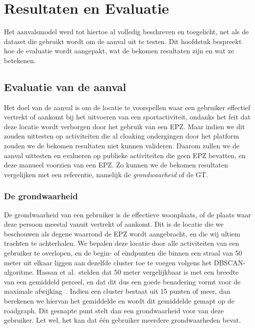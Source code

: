 \chapter{Resultaten en Evaluatie}
Het aanvalsmodel werd tot hiertoe al volledig beschreven en toegelicht, net als
de dataset die gebruikt wordt om de aanval uit te testen. Dit hoofdstuk
bespreekt hoe de evaluatie wordt aangepakt, wat de bekomen resultaten zijn en
wat ze betekenen.

\section{Evaluatie van de aanval}
Het doel van de aanval is om de locatie te voorspellen waar een gebruiker
effectief vertrekt of aankomt bij het uitvoeren van een sportactiviteit,
ondanks het feit dat deze locatie wordt verborgen door het gebruik van een
\ac{EPZ}. Maar indien we dit zouden uittesten op activiteiten die al cloaking
ondergingen door het platform zouden we de bekomen resultaten niet kunnen
valideren. Daarom zullen we de aanval uittesten en evalueren op publieke
activiteiten die geen \ac{EPZ} bevatten, en deze manueel voorzien van een
\ac{EPZ}. Zo kunnen we de bekomen resultaten vergelijken met een referentie,
namelijk de \textit{grondwaarheid} of de \ac{GT}.

\subsection{De grondwaarheid}\label{sec:groundtruth}
De grondwaarheid van een gebruiker is de effectieve woonplaats, of de plaats
waar deze persoon meestal vanuit vertrekt of aankomt. Dit is de locatie die we
beschouwen als degene waarrond de \ac{EPZ} wordt aangebracht, en die wij ultiem
trachten te achterhalen. We bepalen deze locatie door alle activiteiten van een
gebruiker te overlopen, en de begin- of eindpunten die binnen een straal van 50
meter uit elkaar liggen aan dezelfde cluster toe te voegen volgens het
\ac{DBSCAN}-algoritme. Hassan et al.\ stelden dat 50 meter vergelijkbaar is met
een breedte van een gemiddeld perceel, en dat dit dus een goede benadering
vormt voor de maximale afwijking~\cite{sec18has3:online, Verdonck_2022}. Indien
een cluster bestaat uit 15 punten of meer, dan berekenen we hiervan het
gemiddelde en wordt dit gemiddelde gemapt op de roadgraph. Dit gesnapte punt
stelt dan een grondwaarheid voor van deze gebruiker. Let wel, het kan dat één
gebruiker meerdere grondwaarheden bevat.

